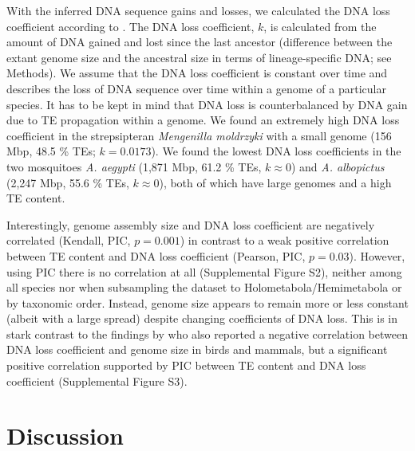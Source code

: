 With the inferred DNA sequence gains and losses, we calculated the DNA
loss coefficient according to \citet{Kapusta2017a}. The DNA loss
coefficient, \(k\), is calculated from the amount of DNA
gained and lost since the last ancestor (difference between the extant
genome size and the ancestral size in terms of lineage-specific DNA; see
Methods). We assume that the DNA loss coefficient is constant over time
and describes the loss of DNA sequence over time within a genome of a
particular species. It has to be kept in mind that DNA loss is
counterbalanced by DNA gain due to TE propagation within a genome. We
found an extremely high DNA loss coefficient in the strepsipteran
\emph{Mengenilla moldrzyki} with a small genome (156 Mbp, 48.5 \% TEs;
\(k = 0.0173\)). We found the lowest DNA loss coefficients in the
two mosquitoes \emph{A. aegypti} (1,871 Mbp, 61.2 \% TEs,
\(k \approx 0\)) and \emph{A. albopictus} (2,247 Mbp, 55.6 \% TEs,
\(k \approx 0\)), both of which have large genomes and a high TE
content.

Interestingly, genome assembly size and DNA loss coefficient are
negatively correlated (Kendall, PIC, \(p = 0.001\)) in contrast to
a weak positive correlation between TE content and DNA loss coefficient
(Pearson, PIC, \(p = 0.03\)). However, using PIC there is no
correlation at all (Supplemental Figure S2), neither among all species
nor when subsampling the dataset to Holometabola/Hemimetabola or by
taxonomic order. Instead, genome size appears to remain more or less
constant (albeit with a large spread) despite changing coefficients of
DNA loss. This is in stark contrast to the findings by
\citet{Kapusta2017a} who also reported a negative correlation between DNA
loss coefficient and genome size in birds and mammals, but a significant
positive correlation supported by PIC between TE content and DNA loss
coefficient (Supplemental Figure S3).


\section{Discussion}\label{discussion}


